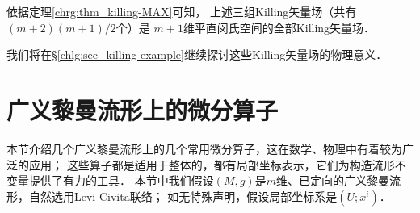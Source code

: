 依据定理\ref{chrg:thm_killing-MAX}可知，
上述三组Killing矢量场（共有${(m+2)(m+1)}/{2}$个）是
$m+1$维平直闵氏空间的全部Killing矢量场．


我们将在\S\ref{chlg:sec_killing-example}继续探讨这些Killing矢量场的物理意义．

\section{广义黎曼流形上的微分算子}
本节介绍几个广义黎曼流形上的几个常用微分算子，这在数学、物理中有着较为广泛的应用；
这些算子都是适用于整体的，都有局部坐标表示，它们为构造流形不变量提供了有力的工具．
本节中我们假设$(M,g)$是$m$维、已定向的广义黎曼流形，自然选用Levi-Civita联络；
如无特殊声明，假设局部坐标系是$(U;x^i)$．

